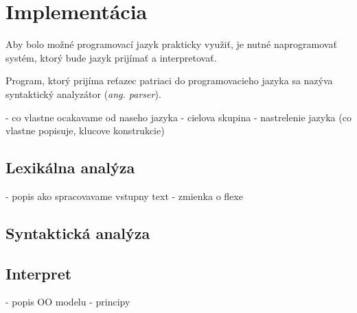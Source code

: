 
\chapter{Implementácia}
Aby bolo možné programovací jazyk prakticky využiť, je nutné naprogramovať systém, ktorý bude jazyk prijímať a interpretovať.

Program, ktorý prijíma reťazec patriaci do programovacieho jazyka sa nazýva
syntaktický analyzátor (\textit{ang. parser}). 


	- co vlastne ocakavame od naseho jazyka
	- cielova skupina
	- nastrelenie jazyka (co vlastne popisuje, klucove konstrukcie)
\section{Lexikálna analýza}
		- popis ako spracovavame vstupny text
		- zmienka o flexe	
\section{Syntaktická analýza}
\section{Interpret}
		- popis OO modelu
		- principy
	
